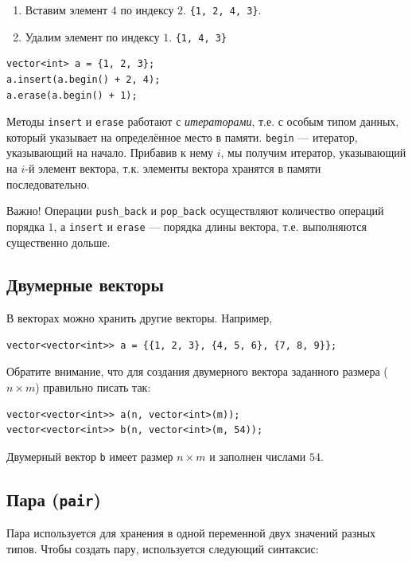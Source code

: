 \documentclass{article}
\newcommand{\important}[1]{
	\begin{sectionenv}[red!30!white]{Важно!}
		#1
	\end{sectionenv}
}
\begin{document}
	\begin{enumerate}
		\item{Вставим элемент $4$ по индексу $2$. \textleftarrow \texttt{\{1, 2, 4, 3\}}.}
		\item{Удалим элемент по индексу $1$. \textleftarrow \texttt{\{1, 4, 3\}}}
	\end{enumerate}
	
	\begin{lstlisting}
vector<int> a = {1, 2, 3};
a.insert(a.begin() + 2, 4);
a.erase(a.begin() + 1);
	\end{lstlisting}
	
	Методы \texttt{insert} и \texttt{erase} работают с \textit{итераторами}, т.е. с особым типом данных, который указывает на определённое место в памяти. \texttt{begin} --- итератор, указывающий на начало. Прибавив к нему $i$, мы получим итератор, указывающий на $i$-й элемент вектора, т.к. элементы вектора хранятся в памяти последовательно.
	
	\important{Операции \texttt{push\_back} и \texttt{pop\_back} осуществляют количество операций порядка $1$, а \texttt{insert} и \texttt{erase} --- порядка длины вектора, т.е. выполняются существенно дольше.}
	
	\subsection{Двумерные векторы}
	
	В векторах можно хранить другие векторы. Например,
	
	\begin{lstlisting}
vector<vector<int>> a = {{1, 2, 3}, {4, 5, 6}, {7, 8, 9}};
	\end{lstlisting}
	
	Обратите внимание, что для создания двумерного вектора заданного размера ($n\times m$) правильно писать так:
	
	\begin{lstlisting}
vector<vector<int>> a(n, vector<int>(m));
vector<vector<int>> b(n, vector<int>(m, 54));
	\end{lstlisting}
	
	Двумерный вектор \texttt{b} имеет размер $n\times m$ и заполнен числами $54$.
	
	\subsection{Пара (\texttt{pair})}
	\label{sec:pair}
	
	Пара используется для хранения в одной переменной двух значений разных типов. Чтобы создать пару, используется следующий синтаксис:
	
\end{document}

